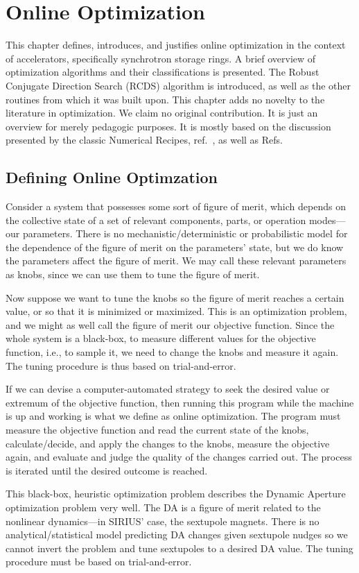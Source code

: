 \chapter{Online Optimization}
This chapter defines, introduces, and justifies online optimization in the context of accelerators, specifically synchrotron storage rings. A brief overview of optimization algorithms and their classifications is presented. The Robust Conjugate Direction Search (RCDS) algorithm is introduced, as well as the other routines from which it was built upon. This chapter adds no novelty to the literature in optimization. We claim no original contribution. It is just an overview for merely pedagogic purposes. It is mostly based on the discussion presented by the classic Numerical Recipes, ref.~\cite{press_numerical_2007}, as well as Refs.
\section{Defining Online Optimzation}
Consider a system that possesses some sort of figure of merit, which depends on the collective state of a set of relevant components, parts, or operation modes—our parameters. There is no mechanistic/deterministic or probabilistic model for the dependence of the figure of merit on the parameters' state, but we do know the parameters affect the figure of merit. We may call these relevant parameters as knobs, since we can use them to tune the figure of merit.

Now suppose we want to tune the knobs so the figure of merit reaches a certain value, or so that it is minimized or maximized. This is an optimization problem, and we might as well call the figure of merit our objective function. Since the whole system is a black-box, to measure different values for the objective function, i.e., to sample it, we need to change the knobs and measure it again. The tuning procedure is thus based on trial-and-error.

If we can devise a computer-automated strategy to seek the desired value or extremum of the objective function, then running this program while the machine is up and working is what we define as online optimization. The program must measure the objective function and read the current state of the knobs, calculate/decide, and apply the changes to the knobs, measure the objective again, and evaluate and judge the quality of the changes carried out. The process is iterated until the desired outcome is reached.

This black-box, heuristic optimization problem describes the Dynamic Aperture optimization problem very well. The DA is a figure of merit related to the nonlinear dynamics—in SIRIUS' case, the sextupole magnets. There is no analytical/statistical model predicting DA changes given sextupole nudges so we cannot invert the problem and tune sextupoles to a desired DA value. The tuning procedure must be based on trial-and-error.

